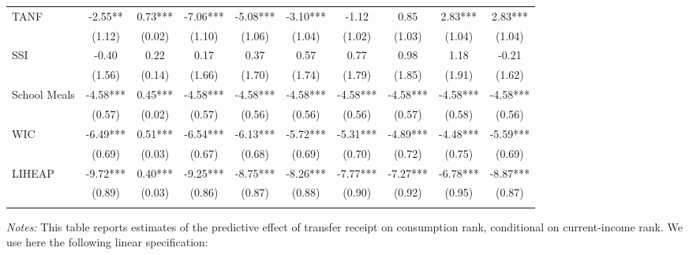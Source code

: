 \begin{table}[]
\begin{tabular*}{1.36\textwidth}{@{\extracolsep{\fill}}lccccccccc}
TANF               & -2.55**        & 0.73***        & -7.06***        & -5.08***        & -3.10***        & -1.12        & 0.85        & 2.83***        & 2.83*** \\
                   & (1.12)            & (0.02)            & (1.10)            & (1.06)            & (1.04)            & (1.02)            & (1.03)            & (1.04)            & (1.04)     \\
\addlinespace
SSI                & -0.40         & 0.22         & 0.17         & 0.37         & 0.57         & 0.77         & 0.98         & 1.18         & -0.21 \\
                   & (1.56)             & (0.14)             & (1.66)             & (1.70)             & (1.74)             & (1.79)             & (1.85)             & (1.91)             & (1.62)     \\
\addlinespace
School Meals       & -4.58*** & 0.45*** & -4.58*** & -4.58*** & -4.58*** & -4.58*** & -4.58*** & -4.58*** & -4.58*** \\
                   & (0.57)     & (0.02)     & (0.57)     & (0.56)     & (0.56)     & (0.56)     & (0.57)     & (0.58)     & (0.56)     \\
\addlinespace
WIC                & -6.49***         & 0.51***         & -6.54***         & -6.13***         & -5.72***         & -5.31***         & -4.89***         & -4.48***         & -5.59*** \\
                   & (0.69)             & (0.03)             & (0.67)             & (0.68)             & (0.69)             & (0.70)             & (0.72)             & (0.75)             & (0.69)     \\
\addlinespace
LIHEAP             & -9.72***      & 0.40***      & -9.25***      & -8.75***      & -8.26***      & -7.77***      & -7.27***      & -6.78***      & -8.87*** \\
                   & (0.89)          & (0.03)          & (0.86)          & (0.87)          & (0.88)          & (0.90)          & (0.92)          & (0.95)          & (0.87)     \\
\addlinespace
\bottomrule
\end{tabular*}
\begin{spacing}{1}
\begin{tablenotes}
\item \footnotesize \textit{Notes:} This table reports estimates of
  the predictive effect of transfer receipt on consumption rank,
  conditional on current-income rank. We use here the following linear specification:

\end{tablenotes}
\end{spacing}
\end{table}
